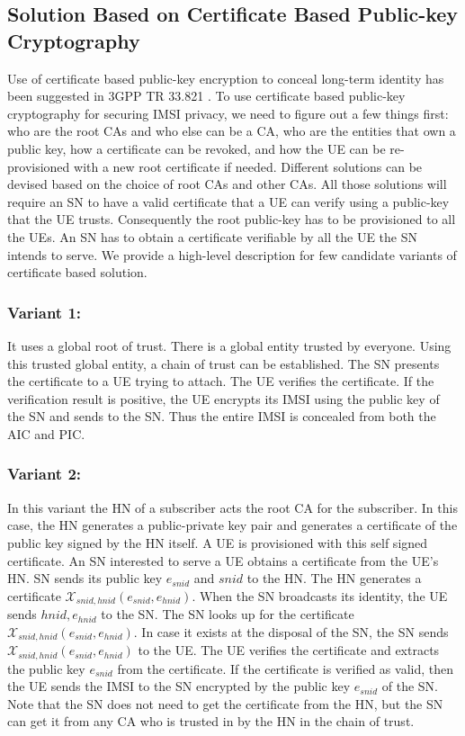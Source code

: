 \documentclass[runningheads,a4paper]{llncs} %
\begin{document}
\subsection{Solution Based on Certificate Based Public-key Cryptography} 
\label{sub_sec:solution_certificate}
Use of certificate based public-key encryption to conceal long-term identity has been suggested in 3GPP TR 33.821 \cite{TR33821}. To use certificate based public-key cryptography for securing IMSI privacy, we need to figure out a few things first: who are the root CAs and who else can be a CA, who are the entities that own a public key, how a certificate can be revoked, and how the UE can be re-provisioned with a new root certificate if needed. Different solutions can be devised based on the choice of root CAs and other CAs. All those solutions will require an SN to have a valid certificate that a UE can verify using a public-key that the UE trusts. Consequently the root public-key has to be provisioned to all the UEs. An SN has to obtain a certificate verifiable by all the UE the SN intends to serve. We provide a high-level description for few candidate variants of certificate based solution.

\subsubsection{Variant 1:}
It uses a global root of trust. There is a global entity trusted by everyone. Using this trusted global entity, a chain of trust can be established. The SN presents the certificate to a UE trying to attach. The UE verifies the certificate. If the verification result is positive, the UE encrypts its IMSI using the public key of the SN and sends to the SN. Thus the entire IMSI is concealed from both the AIC and PIC.

\subsubsection{Variant 2:}
In this variant the HN of a subscriber acts the root CA for the subscriber. In this case, the HN generates a public-private key pair and generates a certificate of the public key signed by the HN itself. A UE is provisioned with this self signed certificate. An SN interested to serve a UE obtains a certificate from the UE's HN. SN sends its public key $e_{snid}$ and $snid$ to the HN. The HN generates a certificate $\mathcal{X}_{snid,hnid} (e_{snid},e_{hnid})$. When the SN broadcasts its identity, the UE sends $hnid,e_{hnid}$ to the SN. The SN looks up for the certificate $\mathcal{X}_{snid,hnid} (e_{snid},e_{hnid})$. In case it exists at the disposal of the SN, the SN sends $\mathcal{X}_{snid,hnid} (e_{snid},e_{hnid})$ to the UE. The UE verifies the certificate and extracts the public key $e_{snid}$ from the certificate. If the certificate is verified as valid, then the UE sends the IMSI to the SN encrypted by the public key $e_{snid}$ of the SN.  Note that the SN does not need to get the certificate from the HN, but the SN can get it from any CA who is trusted in by the HN in the chain of trust. 
\end{document}
